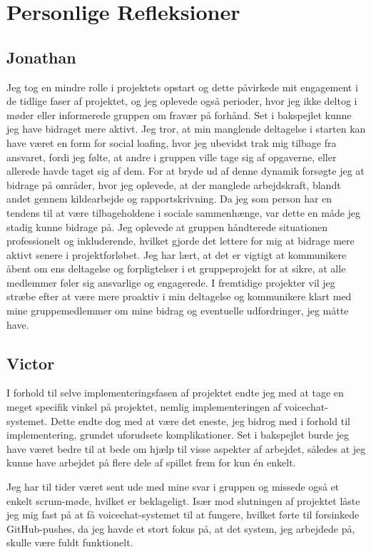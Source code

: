 \section{Personlige Refleksioner}
\subsection{Jonathan}
Jeg tog en mindre rolle i projektets opstart og dette påvirkede mit engagement i de tidlige faser af projektet, og jeg oplevede også perioder, hvor jeg ikke deltog i møder eller informerede gruppen om fravær på forhånd. Set i bakspejlet kunne jeg have bidraget mere aktivt. Jeg tror, at min manglende deltagelse i starten kan have været en form for social loafing, hvor jeg ubevidst trak mig tilbage fra ansvaret, fordi jeg følte, at andre i gruppen ville tage sig af opgaverne, eller allerede havde taget sig af dem. For at bryde ud af denne dynamik forsøgte jeg at bidrage på områder, hvor jeg oplevede, at der manglede arbejdskraft, blandt andet gennem kildearbejde og rapportskrivning. Da jeg som person har en tendens til at være tilbageholdene i sociale sammenhænge, var dette en måde jeg stadig kunne bidrage på.
Jeg oplevede at gruppen håndterede situationen professionelt og inkluderende, hvilket gjorde det lettere for mig at bidrage mere aktivt senere i projektforløbet. Jeg har lært, at det er vigtigt at kommunikere åbent om ens deltagelse og forpligtelser i et gruppeprojekt for at sikre, at alle medlemmer føler sig ansvarlige og engagerede. I fremtidige projekter vil jeg stræbe efter at være mere proaktiv i min deltagelse og kommunikere klart med mine gruppemedlemmer om mine bidrag og eventuelle udfordringer, jeg måtte have.
\newpage

\subsection{Victor}
I forhold til selve implementeringsfasen af projektet endte jeg med at tage en meget specifik vinkel på projektet, nemlig implementeringen af voicechat-systemet. Dette endte dog med at være det eneste, jeg bidrog med i forhold til implementering, grundet uforudsete komplikationer. Set i bakspejlet burde jeg have været bedre til at bede om hjælp til visse aspekter af arbejdet, således at jeg kunne have arbejdet på flere dele af spillet frem for kun én enkelt.

Jeg har til tider været sent ude med mine svar i gruppen og missede også et enkelt scrum-møde, hvilket er beklageligt. Især mod slutningen af projektet låste jeg mig fast på at få voicechat-systemet til at fungere, hvilket førte til forsinkede GitHub-pushes, da jeg havde et stort fokus på, at det system, jeg arbejdede på, skulle være fuldt funktionelt.

